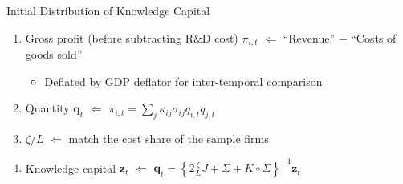 \documentclass[
  aspectratio=169,  %
  handout           %
]{beamer}
\theoremstyle{plain}
\begin{document}
%
\begin{frame}{Initial Distribution of Knowledge Capital}
  \begin{enumerate}
    \item Gross profit (before subtracting R\&D cost) $\pi_{i,t}$ $\Longleftarrow$
          ``Revenue'' $-$ ``Costs of goods sold''
          \begin{itemize}
            \item Deflated by GDP deflator for inter-temporal comparison\medskip{}
          \end{itemize}
    \item Quantity $\symbf{q}_{t}$ $\Longleftarrow$ $\pi_{i,t}=\sum_{j}\kappa_{ij}\sigma_{ij}q_{i,t}q_{j,t}$\medskip{}
    \item $\zeta/L$ $\Longleftarrow$ match the cost share of the sample firms\medskip{}
    \item Knowledge capital $\symbf{z}_{t}$ $\Longleftarrow$ $\symbf{q}_{t}=\left\{ 2\frac{\zeta}{L}J+\Sigma+K\circ\Sigma\right\} ^{-1}\symbf{z}_{t}$
  \end{enumerate}
\end{frame}
%
\end{document}
